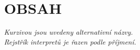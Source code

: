 \hypersetup{
linkcolor=black
}
\hypertarget{obsah}{}
\section*{\Huge OBSAH}
\large
\noindent\textit{Kurzivou jsou uvedeny alternativní názvy.\\
Rejstřík interpretů je řazen podle příjmení.}
\vspace{-5pt}


\newpage

